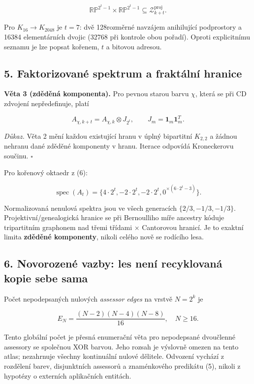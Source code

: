 \documentclass[
  10pt,
]{article}
\begin{document}
\[
\mathbb{RP}^{2^t-1}\times\mathbb{RP}^{2^t-1}\subseteq\mathscr Z_{k+t}^{\mathrm{proj}}.
\tag{9}
\]

Pro \(K_{16}\to K_{2048}\) je \(t=7\): dvě 128rozměrné navzájem
anihilující podprostory a 16384 elementárních dvojic (32768 při kontrole
obou pořadí). Oproti explicitnímu seznamu je lze popsat kořenem, \(t\) a
bitovou adresou.

\subsection{5. Faktorizované spektrum a fraktální
hranice}\label{faktorizovanuxe9-spektrum-a-fraktuxe1lnuxed-hranice}

\textbf{Věta 3 (zděděná komponenta).} Pro pevnou starou barvu \(\chi\),
která se při CD zdvojení nepředefinuje, platí

\[
A_{\chi,k+t}=A_{\chi,k}\otimes J_{2^t},\qquad J_m=\mathbf1_m\mathbf1_m^T.
\tag{10}
\]

\emph{Důkaz.} Věta 2 mění každou existující hranu v úplný bipartitní
\(K_{2,2}\) a žádnou nehranu dané zděděné komponenty v hranu. Iterace
odpovídá Kroneckerovu součinu. \(\square\)

Pro kořenový oktaedr z (6):

\[
\operatorname{spec}(A_t)=\{4\cdot 2^t,-2\cdot2^t,-2\cdot2^t,0^{\times(6\cdot2^t-3)}\}.
\tag{11}
\]

Normalizovaná nenulová spektra jsou ve všech generacích
\(\{2/3,-1/3,-1/3\}\). Projektivní/genealogická hranice se při
Bernoulliho míře ancestry kóduje tripartitním graphonem nad třemi
třídami × Cantorovou hranicí. Je to exaktní limita \textbf{zděděné
komponenty}, nikoli celého nově se rodícího lesa.

\subsection{6. Novorozené vazby: les není recyklovaná kopie sebe
sama}\label{novorozenuxe9-vazby-les-nenuxed-recyklovanuxe1-kopie-sebe-sama}

Počet nepodepsaných nulových \emph{assessor edges} na vrstvě \(N=2^k\)
je

\[
E_N=\frac{(N-2)(N-4)(N-8)}{16},\quad N\ge16.
\tag{12}
\]

Tento globální počet je přesná enumerační věta pro nepodepsané
dvoučlenné assessory se společnou XOR barvou. Jeho rozsah je výslovně
omezen na tento atlas; nezahrnuje všechny kontinuální nulové dělitele.
Odvození vychází z rozdělení barev, disjunktních assessorů a
znaménkového predikátu (5), nikoli z hypotézy o externích aplikačních
entitách.
\end{document}

